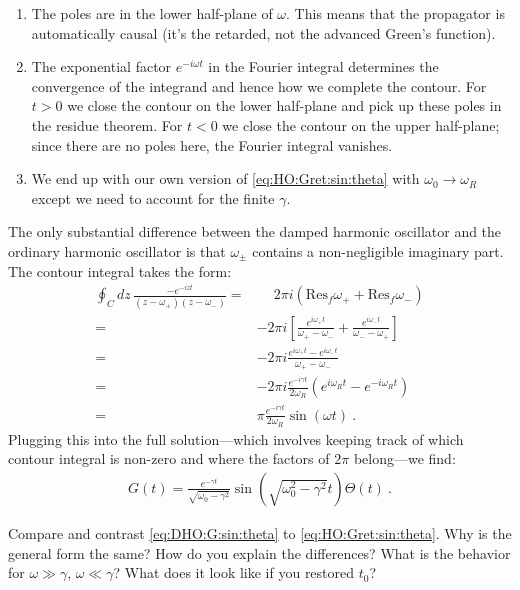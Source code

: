  \begin{enumerate}
 \item The poles are in the lower half-plane of $\omega$. This means that the propagator is automatically causal (it's the retarded, not the advanced Green's function).
 \item The exponential factor $e^{-i\omega t}$ in the Fourier integral determines the convergence of the integrand and hence how we complete the contour. For $t>0$ we close the contour on the lower half-plane and pick up these poles in the residue theorem. For $t<0$ we close the contour on the upper half-plane; since there are no poles here, the Fourier integral vanishes.
 \item We end up with our own version of \eqref{eq:HO:Gret:sin:theta} with $\omega_0\to\omega_R$ except we need to account for the finite $\gamma$. 
 \end{enumerate}
 The only substantial difference between the damped harmonic oscillator and the ordinary harmonic oscillator is that $\omega_\pm$ contains a non-negligible imaginary part. The contour integral takes the form:
 \begin{align}
 	\oint_C dz \,
 	\frac{-e^{-izt}}{
 	\left(z-\omega_+\right)
 	\left(z-\omega_-\right)
 	}
 	=&
 	\phantom+ 
 	2\pi i\left(\text{Res}_f\omega_+ + \text{Res}_f\omega_-\right)
 	\\
 	=&
 	-2\pi i\left[
 	\frac{e^{i\omega_+t}}{\omega_+-\omega_-}
 	+
 	\frac{e^{i\omega_-t}}{\omega_--\omega_+}
 	\right]
 	\\
 	=&
 	-2\pi i
 	\frac{e^{i\omega_+t} - e^{i\omega_-t}}{\omega_+-\omega_-}
 	\\
 	=&
 	-2\pi i \frac{e^{-i\gamma t}}{2\omega_R}
 	\left(e^{i\omega_Rt} - e^{-i\omega_Rt}\right)
 	\\
 	=&
 	\pi \frac{e^{-i\gamma t}}{2\omega_R}
 	\sin(\omega t)
 	 \ .
 \end{align}
 Plugging this into the full solution---which involves keeping track of which contour integral is non-zero and where the factors of $2\pi$ belong---we find:
 \begin{align}
 	G(t) = \frac{e^{-\gamma t}}{\sqrt{\omega_0-\gamma^2}} \sin\left(\sqrt{\omega_0^2-\gamma^2} t\right) \Theta(t) \ .
 	\label{eq:DHO:G:sin:theta}
 \end{align} 
 \begin{exercise}
Compare and contrast \eqref{eq:DHO:G:sin:theta} to \eqref{eq:HO:Gret:sin:theta}. Why is the general form the same? How do you explain the differences? What is the behavior for $\omega \gg \gamma$, $\omega \ll \gamma$? What does it look like if you restored $t_0$?
 \end{exercise}

